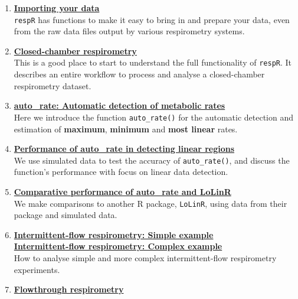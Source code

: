 \documentclass[]{book}
\begin{document}
\begin{enumerate}
\def\labelenumi{\arabic{enumi}.}
\item
  \textbf{\href{https://januarharianto.github.io/respR/articles/importing.html}{Importing
  your data}}\\
  \texttt{respR} has functions to make it easy to bring in and prepare
  your data, even from the raw data files output by various respirometry
  systems.
\item
  \textbf{\href{https://januarharianto.github.io/respR/articles/closed.html}{Closed-chamber
  respirometry}}\\
  This is a good place to start to understand the full functionality of
  \texttt{respR}. It describes an entire workflow to process and analyse
  a closed-chamber respirometry dataset.
\item
  \textbf{\href{https://januarharianto.github.io/respR/articles/auto_rate.html}{auto\_rate:
  Automatic detection of metabolic rates}}\\
  Here we introduce the function \texttt{auto\_rate()} for the automatic
  detection and estimation of \textbf{maximum}, \textbf{minimum} and
  \textbf{most linear} rates.
\item
  \textbf{\href{https://januarharianto.github.io/respR/articles/performance.html}{Performance
  of auto\_rate in detecting linear regions}}\\
  We use simulated data to test the accuracy of \texttt{auto\_rate()},
  and discuss the function's performance with focus on linear data
  detection.
\item
  \textbf{\href{https://januarharianto.github.io/respR/articles/auto_rate_comp.html}{Comparative
  performance of auto\_rate and LoLinR}}\\
  We make comparisons to another R package, \texttt{LoLinR}, using data
  from their package and simulated data.
\item
  \textbf{\href{https://januarharianto.github.io/respR/articles/intermittent.html}{Intermittent-flow
  respirometry: Simple example}}\\
  \textbf{\href{https://januarharianto.github.io/respR/articles/intermittent2.html}{Intermittent-flow
  respirometry: Complex example}}\\
  How to analyse simple and more complex intermittent-flow respirometry
  experiments.
\item
  \textbf{\href{https://januarharianto.github.io/respR/articles/flowthrough.html}{Flowthrough
  respirometry}}\\

\end{enumerate}
\end{document}
